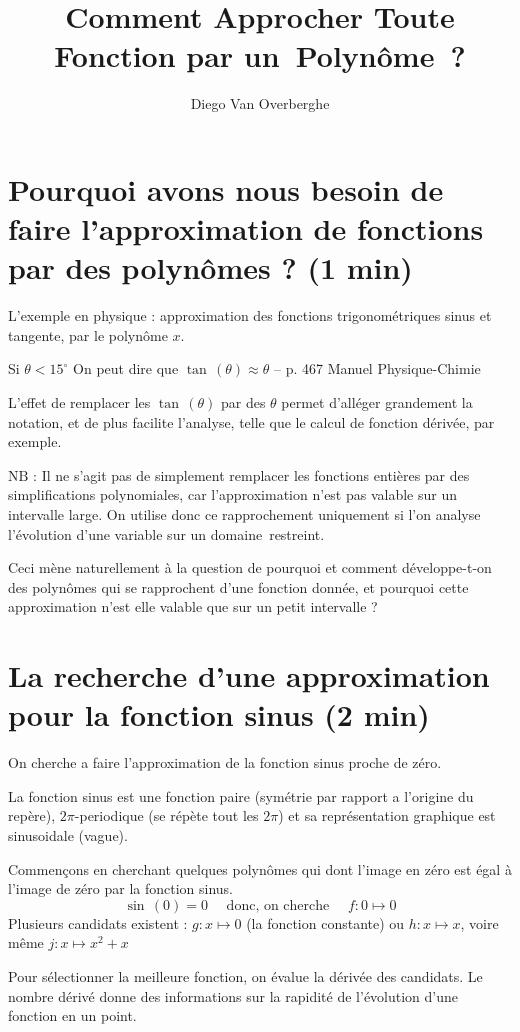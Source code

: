 \documentclass[DIV=12]{scrartcl}
\title{Comment Approcher Toute Fonction par un~Polynôme~?}
\author{Diego Van Overberghe}
\begin{document}
    \maketitle
    \section{Pourquoi avons nous besoin de faire l'approximation de fonctions par des polynômes ? (1 min)}
    L'exemple en physique : approximation des fonctions trigonométriques sinus et tangente, par le polynôme $x$.
    \begin{center}
        \og Si $\theta<15^{\circ}$ On peut dire que $\tan\,(\theta)\approx\theta$ \fg{}\quad -- p. 467 Manuel Physique-Chimie
    \end{center}
    L'effet de remplacer les $\tan\,(\theta)$ par des $\theta$ permet d'alléger grandement la notation, et de plus facilite l'analyse, telle que le calcul de fonction dérivée, par exemple. 

    $\mathrm{N}\mathrm{B}$ : Il ne s'agit pas de simplement remplacer les fonctions entières par des simplifications polynomiales, car l'approximation n'est pas valable sur un intervalle large. On  utilise donc ce rapprochement uniquement si l'on analyse l'évolution d'une variable sur un domaine~restreint.

    Ceci mène naturellement à la question de pourquoi et comment développe-t-on des polynômes qui se rapprochent d'une fonction donnée, et pourquoi cette approximation n'est elle valable que sur un petit intervalle ?

    \section{La recherche d'une approximation pour la fonction sinus (2 min)}
    On cherche a faire l'approximation de la fonction sinus proche de zéro.

    La fonction sinus est une fonction paire (symétrie par rapport a l'origine du repère), $2\pi$-periodique (se répète tout les $2\pi$) et sa représentation graphique est sinusoidale (vague). 
    
    Commençons en cherchant quelques polynômes qui dont l'image en zéro est égal à l'image de zéro par la fonction sinus. 
    \[\sin\,(0)=0\quad\text{ donc, on cherche }\quad f:0\mapsto 0\]
    Plusieurs candidats existent : $g:x\mapsto 0$ (la fonction constante) ou $h:x\mapsto x$, voire même $j:x\mapsto x^2+x$
    
    Pour sélectionner la meilleure fonction, on évalue la dérivée des candidats. Le nombre dérivé donne des informations sur la rapidité de l'évolution d'une fonction en un point.
    
\end{document}
